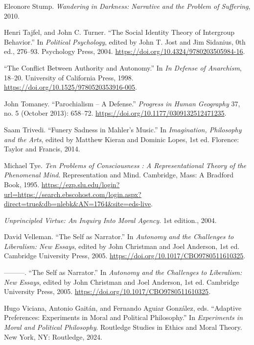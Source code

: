 \documentclass[phdthesis,12pt,final,a4paper]{wuthesis}
\newlength{\cslhangindent}
\newenvironment{CSLReferences}[2] %
{\begin{list}{}{%
	\setlength{\itemindent}{0pt}
	\setlength{\leftmargin}{0pt}
	\setlength{\parsep}{0pt}
	\ifodd #1
	\setlength{\leftmargin}{\cslhangindent}
	\setlength{\itemindent}{-1\cslhangindent}
	\fi
	\setlength{\itemsep}{#2\baselineskip}}}
{\end{list}}
\theoremstyle{definition}
\theoremstyle{definition}
\theoremstyle{definition}
\theoremstyle{definition}
\theoremstyle{remark}
\begin{document}
\begin{CSLReferences}{1}{0}
Eleonore Stump. \emph{Wandering in {Darkness}: {Narrative} and the {Problem} of {Suffering}}, 2010.

Henri Tajfel, and John C. Turner. {``The {Social Identity Theory} of {Intergroup Behavior}.''} In \emph{Political {Psychology}}, edited by John T. Jost and Jim Sidanius, 0th ed., 276--93. Psychology Press, 2004. \url{https://doi.org/10.4324/9780203505984-16}.

{``The {Conflict Between Authority} and {Autonomy}.''} In \emph{In {Defense} of {Anarchism}}, 18--20. University of California Press, 1998. \url{https://doi.org/10.1525/9780520353916-005}.

John Tomaney. {``Parochialism -- {A Defense}.''} \emph{Progress in Human Geography} 37, no. 5 (October 2013): 658--72. \url{https://doi.org/10.1177/0309132512471235}.

Saam Trivedi. {``Funery {Sadness} in {Mahler}'s {Music}.''} In \emph{Imagination, {Philosophy} and the {Arts}}, edited by Matthew Kieran and Dominic Lopes, 1st ed. Florence: {Taylor and Francis}, 2014.

Michael Tye. \emph{Ten {Problems} of {Consciousness} : {A Representational Theory} of the {Phenomenal Mind}}. Representation and {Mind}. Cambridge, Mass: A Bradford Book, 1995. \url{https://ezp.slu.edu/login?url=https://search.ebscohost.com/login.aspx?direct=true&db=nlebk&AN=1764&site=eds-live}.

\emph{Unprincipled {Virtue}: {An Inquiry Into Moral Agency}}. 1st edition., 2004.

David Velleman. {``The {Self} as {Narrator}.''} In \emph{Autonomy and the {Challenges} to {Liberalism}: {New Essays}}, edited by John Christman and Joel Anderson, 1st ed. Cambridge University Press, 2005. \url{https://doi.org/10.1017/CBO9780511610325}.

---------. {``The {Self} as {Narrator}.''} In \emph{Autonomy and the {Challenges} to {Liberalism}: {New Essays}}, edited by John Christman and Joel Anderson, 1st ed. Cambridge University Press, 2005. \url{https://doi.org/10.1017/CBO9780511610325}.

Hugo Viciana, Antonio Gaitán, and Fernando Aguiar González, eds. {``Adaptive {Preferences}: {Experiments} in {Moral} and {Political Philosophy}.''} In \emph{Experiments in Moral and Political Philosophy}. Routledge Studies in Ethics and Moral Theory. New York, NY: Routledge, 2024.


\end{CSLReferences}
\end{document}
